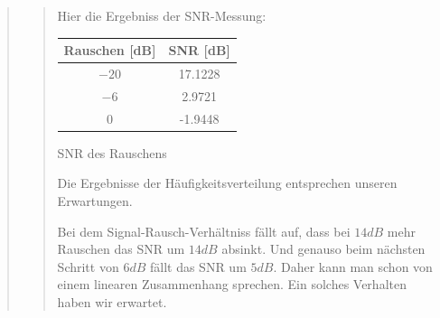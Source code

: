 \begin{quote}
\begin{quote}
        
        Hier die Ergebniss der SNR-Messung:
            \begin{center}
                  \begin{tabular}{|c|c|}
                  \hline
                   Rauschen [dB] &  SNR [dB] \\ \hline 
                   $-20$ &  17.1228 \\ \hline
                   $-6$ &  2.9721 \\ \hline
                   $0$ &  -1.9448 \\ \hline           
                 \end{tabular}\vspace{1em}
                 
            \caption{SNR des Rauschens}            
            \end{center}
    
        Die Ergebnisse der Häufigkeitsverteilung entsprechen unseren Erwartungen. 
    
        Bei dem Signal-Rausch-Verhältniss fällt auf, dass bei $14dB$ mehr Rauschen das SNR um $14dB$ absinkt. Und
        genauso beim nächsten Schritt von $6dB$ fällt das SNR um $5dB$. Daher kann man schon von einem linearen
        Zusammenhang sprechen. Ein solches Verhalten haben wir erwartet. 
        
    \end{quote}
\end{quote}


\newpage
